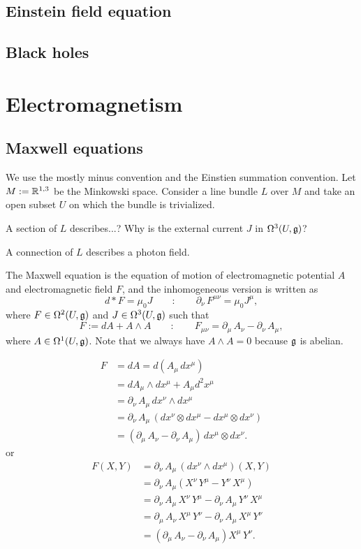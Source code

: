 \documentclass{../../large}
\begin{document}
\section{Einstein field equation}
\section{Black holes}



\chapter{Electromagnetism}
\section{Maxwell equations}
We use the mostly minus convention and the Einstien summation convention.
Let $M:=\mathbb{R}^{1,3}$ be the Minkowski space.
Consider a line bundle $L$ over $M$ and take an open subset $U$ on which the bundle is trivialized.

A section of $L$ describes...?
Why is the external current $J$ in $\Omega^3(U,\mathfrak{g})$?

A connection of $L$ describes a photon field.

The Maxwell equation is the equation of motion of electromagnetic potential $A$ and electromagnetic field $F$, and the inhomogeneous version is written as
\[d*F=\mu_0 J\qquad:\qquad\partial_\nu\,F^{\mu\nu}=\mu_0J^\mu,\]
where $F\in\Omega^2(U,\mathfrak{g})$ and $J\in\Omega^3(U,\mathfrak{g})$ such that
\[F:=dA+A\wedge A\qquad:\qquad F_{\mu\nu}=\partial_\mu\,A_\nu-\partial_\nu\,A_\mu,\]
where $A\in\Omega^1(U,\mathfrak{g})$.
Note that we always have $A\wedge A=0$ because $\mathfrak{g}$ is abelian.

\begin{align*}
F&=dA=d(A_\mu\,dx^\mu)\\
&=dA_\mu\wedge dx^\mu+A_\mu d^2x^\mu\\
&=\partial_\nu\,A_\mu\,dx^\nu\wedge dx^\mu\\
&=\partial_\nu\,A_\mu\,(dx^\nu\otimes dx^\mu-dx^\mu\otimes dx^\nu)\\
&=(\partial_\mu\,A_\nu-\partial_\nu\,A_\mu)\,dx^\mu\otimes dx^\nu.
\end{align*}
or
\begin{align*}
F(X,Y)
&=\partial_\nu\,A_\mu\,(dx^\nu\wedge dx^\mu)(X,Y)\\
&=\partial_\nu\,A_\mu(X^\nu\,Y^\mu-Y^\nu\,X^\mu)\\
&=\partial_\nu\,A_\mu\,X^\nu\,Y^\mu-\partial_\nu\,A_\mu\,Y^\nu\,X^\mu\\
&=\partial_\mu\,A_\nu\,X^\mu\,Y^\nu-\partial_\nu\,A_\mu\,X^\mu\,Y^\nu\\
&=(\partial_\mu\,A_\nu-\partial_\nu\,A_\mu)X^\mu\,Y^\nu.
\end{align*}
\end{document}
